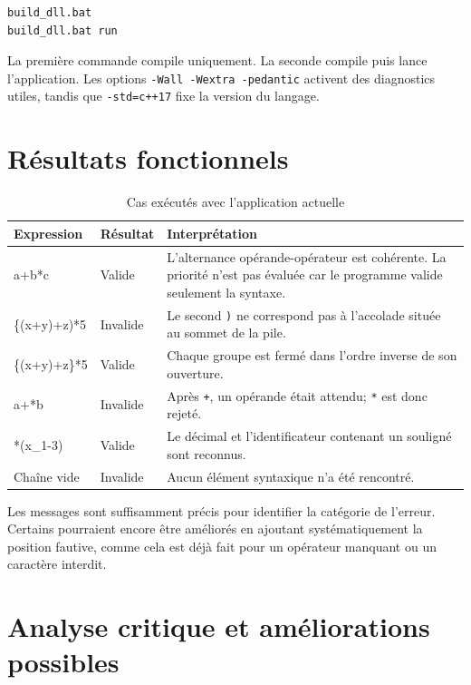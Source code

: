 \documentclass[11pt,a4paper]{article}
\begin{document}
\begin{lstlisting}[style=console,caption={Utilisation normale du projet}]
build_dll.bat
build_dll.bat run
\end{lstlisting}

La première commande compile uniquement. La seconde compile puis lance l'application. Les options \texttt{-Wall -Wextra -pedantic} activent des diagnostics utiles, tandis que \texttt{-std=c++17} fixe la version du langage.

\section{Résultats fonctionnels}

\begin{table}[ht]
\centering
\caption{Cas exécutés avec l'application actuelle}
\begin{tabularx}{\textwidth}{>{\ttfamily}p{3.7cm} l X}
\toprule
\normalfont\textbf{Expression} & \textbf{Résultat} & \textbf{Interprétation} \\
\midrule
a+b*c & Valide & L'alternance opérande-opérateur est cohérente. La priorité n'est pas évaluée car le programme valide seulement la syntaxe. \\
\{(x+y)+z)*5 & Invalide & Le second \texttt{)} ne correspond pas à l'accolade située au sommet de la pile. \\
\{(x+y)+z\}*5 & Valide & Chaque groupe est fermé dans l'ordre inverse de son ouverture. \\
a+*b & Invalide & Après \texttt{+}, un opérande était attendu; \texttt{*} est donc rejeté. \\
12.5*(x\_1-3) & Valide & Le décimal et l'identificateur contenant un souligné sont reconnus. \\
Chaîne vide & Invalide & Aucun élément syntaxique n'a été rencontré. \\
\bottomrule
\end{tabularx}
\end{table}

Les messages sont suffisamment précis pour identifier la catégorie de l'erreur. Certains pourraient encore être améliorés en ajoutant systématiquement la position fautive, comme cela est déjà fait pour un opérateur manquant ou un caractère interdit.

\section{Analyse critique et améliorations possibles}
\end{document}
